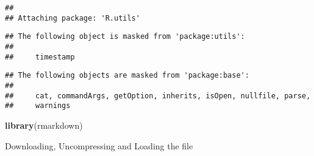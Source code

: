 \documentclass[
]{article}
\newenvironment{Shaded}{\begin{snugshade}}{\end{snugshade}}
\newcommand{\ControlFlowTok}[1]{\textcolor[rgb]{0.13,0.29,0.53}{\textbf{#1}}}
\newcommand{\DataTypeTok}[1]{\textcolor[rgb]{0.13,0.29,0.53}{#1}}
\newcommand{\KeywordTok}[1]{\textcolor[rgb]{0.13,0.29,0.53}{\textbf{#1}}}
\newcommand{\NormalTok}[1]{#1}
\newcommand{\OperatorTok}[1]{\textcolor[rgb]{0.81,0.36,0.00}{\textbf{#1}}}
\newcommand{\OtherTok}[1]{\textcolor[rgb]{0.56,0.35,0.01}{#1}}
\newcommand{\StringTok}[1]{\textcolor[rgb]{0.31,0.60,0.02}{#1}}
\begin{document}
\begin{verbatim}
## 
## Attaching package: 'R.utils'
\end{verbatim}

\begin{verbatim}
## The following object is masked from 'package:utils':
## 
##     timestamp
\end{verbatim}

\begin{verbatim}
## The following objects are masked from 'package:base':
## 
##     cat, commandArgs, getOption, inherits, isOpen, nullfile, parse,
##     warnings
\end{verbatim}

\begin{Shaded}
\begin{Highlighting}[]
\KeywordTok{library}\NormalTok{(rmarkdown)}
\end{Highlighting}
\end{Shaded}

Downloading, Uncompressing and Loading the file

\begin{Shaded}
\end{Shaded}
\end{document}
